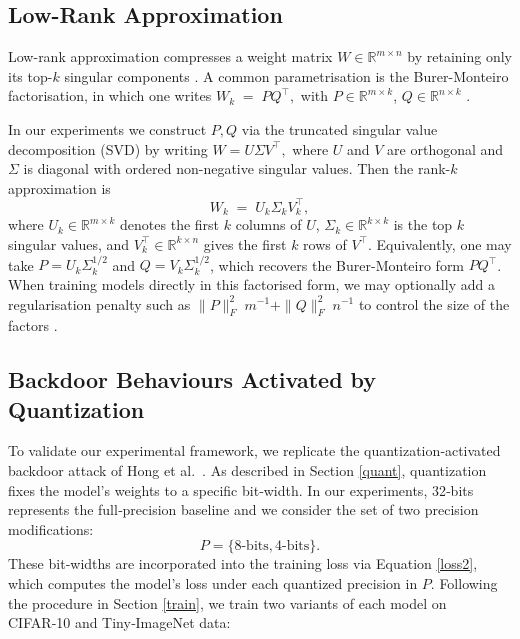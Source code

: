 \documentclass{article}
\theoremstyle{plain}
\theoremstyle{definition}
\theoremstyle{remark}
\begin{document}
\subsection{Low-Rank Approximation}\label{lowrank}
Low-rank approximation compresses a weight matrix \(W \in \mathbb{R}^{m\times n}\) by retaining only its top-\(k\) singular components \cite{banerjee_linear_2014}. A common parametrisation is the Burer-Monteiro factorisation, in which one writes
\(
W_k \;=\; P Q^\top,
\)
with \(P \in \mathbb{R}^{m\times k}\), \(Q \in \mathbb{R}^{n\times k}\) \cite{waldspurger_rank_2019,burer_local_2005}.  

In our experiments we construct \(P, Q\) via the truncated singular value decomposition (SVD) by writing
\(
W = U \Sigma V^\top,
\)
where \(U\) and \(V\) are orthogonal and \(\Sigma\) is diagonal with ordered non-negative singular values. Then the rank-\(k\) approximation is
\[
W_k \;=\; U_k \Sigma_k V_k^\top,
\]
where \(U_k \in \mathbb{R}^{m\times k}\) denotes the first \(k\) columns of \(U\), \(\Sigma_k \in \mathbb{R}^{k\times k}\) is the top \(k\) singular values, and \(V_k^\top \in \mathbb{R}^{k\times n}\) gives the first \(k\) rows of \(V^\top\).  
Equivalently, one may take \(P = U_k \Sigma_k^{1/2}\) and \(Q = V_k \Sigma_k^{1/2}\), which recovers the Burer-Monteiro form \(PQ^\top\). When training models directly in this factorised form, we may optionally add a regularisation penalty such as \(\|P\|_F^2 \; m^{-1} + \|Q\|_F^2 \; n^{-1} \) to control the size of the factors \cite{waldspurger_rank_2019}.


\subsection{Backdoor Behaviours Activated by Quantization}\label{ap3}
To validate our experimental framework, we replicate the quantization‑activated backdoor attack of Hong et al.\ \cite{hong_qu-anti-zation_2021}. As described in Section \ref{quant}, quantization fixes the model’s weights to a specific bit‑width. In our experiments, 32‑bits represents the full‑precision baseline and we consider the set of two precision modifications:
\[
P = \{8\textrm{-bits}, 4\textrm{-bits}\}.
\]
These bit‑widths are incorporated into the training loss via Equation \ref{loss2}, which computes the model’s loss under each quantized precision in \(P\). Following the procedure in Section \ref{train}, we train two variants of each model on CIFAR‑10 and Tiny‑ImageNet data:
\end{document}
